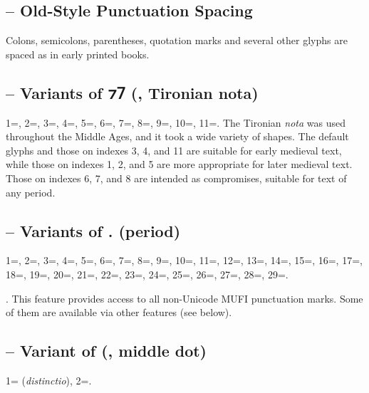 \subsection{ – Old-Style Punctuation Spacing}
Colons, semicolons, parentheses, quotation marks and several other glyphs are spaced as in early printed books.

\subsection{ – Variants of ⁊⹒
(, Tironian nota)}
1=, 2=, 3=, 4=, 5=,
6=, 7=, 8=, 9=,
10=, 11=. The Tironian \textit{nota} was
used throughout the Middle Ages, and it took a wide variety of shapes. The default glyphs and those
on indexes 3, 4, and 11 are suitable for early medieval text, while those on indexes 1, 2, and 5
are more appropriate for later medieval text. Those on indexes 6, 7, and 8 are intended as
compromises, suitable for text of any period.

\subsection{ –
  Variants of . (period)}
1=, 2=, 3=, 4=, 5=, 6=,
7=, 8=, 9=, 10=, 11=, 12=,
13=, 14=, 15=, 16=, 17=,
18=, 19=, 20=, 21=, 22=,
23=, 24=, 25=, 26=, 27=,
28=, 29=.

. This feature provides access to all non-Unicode MUFI punctuation marks. Some of them
are available via other features (see below).

\subsection{ – Variant of {\textperiodcentered} (, middle dot)}
1= (\textit{distinctio}), 2=.

